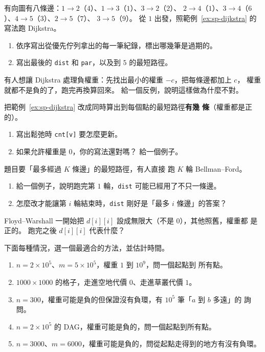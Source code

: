 \begin{drills}[label=drills:ch8]
\item 有向圖有八條邊：$1 \to 2$（$4$）、$1 \to 3$（$1$）、$3 \to 2$（$2$）、
$2 \to 4$（$1$）、$3 \to 4$（$6$）、$4 \to 5$（$3$）、$2 \to 5$（$7$）、
$3 \to 5$（$9$）。 從 $1$ 出發，照範例~\ref{ex:sp-dijkstra} 的寫法跑
Dijkstra。
\begin{enumerate}
\item 依序寫出從優先佇列拿出的每一筆紀錄，標出哪幾筆是過期的。
\item 寫出最後的 \texttt{dist} 和 \texttt{par}，以及到 $5$ 的最短路徑。
\end{enumerate}

\item 有人想讓 Dijkstra 處理負權重：先找出最小的權重 $-c$，把每條邊都加上 $c$，
權重就都不是負的了，跑完再換算回來。 給一個反例，說明這樣做為什麼不對。

\item 把範例~\ref{ex:sp-dijkstra} 改成同時算出到每個點的最短路徑\textbf{有幾
條}（權重都是正的）。
\begin{enumerate}
\item 寫出鬆弛時 \texttt{cnt[v]} 要怎麼更新。
\item 如果允許權重是 $0$，你的寫法還對嗎？ 給一個例子。
\end{enumerate}

\item \label{drill:sp-klimit} 題目要「最多經過 $K$ 條邊」的最短路徑，有人直接
跑 $K$ 輪 Bellman--Ford。
\begin{enumerate}
\item 給一個例子，說明跑完第 $1$ 輪，\texttt{dist} 可能已經用了不只一條邊。
\item 怎麼改才能讓第 $i$ 輪結束時，\texttt{dist} 剛好是「最多 $i$ 條邊」的答案？
\end{enumerate}

\item Floyd--Warshall 一開始把 $d[i][i]$ 設成無限大（不是 $0$），其他照舊，權重都
是正的。 跑完之後 $d[i][i]$ 代表什麼？

\item 下面每種情況，選一個最適合的方法，並估計時間。
\begin{enumerate}
\item $n = 2 \times 10^5$、$m = 5 \times 10^5$，權重 $1$ 到 $10^9$，問一個起點到
所有點。
\item $1000 \times 1000$ 的格子，走進空地代價 $0$、走進草叢代價 $1$。
\item $n = 300$，權重可能是負的但保證沒有負環，有 $10^5$ 筆「$a$ 到 $b$ 多遠」的
詢問。
\item $n = 2 \times 10^5$ 的 DAG，權重可能是負的，問一個起點到所有點。
\item $n = 3000$、$m = 6000$，權重可能是負的，問從起點走得到的地方有沒有負環。
\end{enumerate}
\end{drills}

